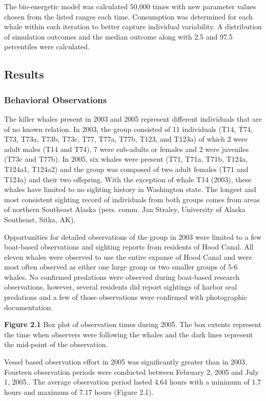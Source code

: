 The bio-energetic model was calculated 50,000 times with new parameter
values chosen from the listed ranges each time. Consumption was
determined for each whale within each iteration to better capture
individual variability. A distribution of simulation outcomes and the
median outcome along with 2.5 and 97.5 percentiles were calculated.

\subsection{Results}\label{results}

\subsubsection{Behavioral Observations}\label{behavioral-observations-1}

The killer whales present in 2003 and 2005 represent different
individuals that are of no known relation. In 2003, the group consisted
of 11 individuals (T14, T74, T73, T73a, T73b, T73c, T77, T77a, T77b,
T123, and T123a) of which 2 were adult males (T14 and T74), 7 were
sub-adults or females and 2 were juveniles (T73c and T77b). In 2005, six
whales were present (T71, T71a, T71b, T124a, T124a1, T124a2) and the
group was composed of two adult females (T71 and T124a) and their two
offspring. With the exception of whale T14 (2003), these whales have
limited to no sighting history in Washington state. The longest and most
consistent sighting record of individuals from both groups comes from
areas of northern Southeast Alaska (pers. comm. Jan Straley, University
of Alaska Southeast, Sitka, AK).

Opportunities for detailed observations of the group in 2003 were
limited to a few boat-based observations and sighting reports from
residents of Hood Canal. All eleven whales were observed to use the
entire expanse of Hood Canal and were most often observed as either one
large group or two smaller groups of 5-6 whales. No confirmed predations
were observed during boat-based research observations, however, several
residents did report sightings of harbor seal predations and a few of
those observations were confirmed with photographic documentation.

\textbf{Figure 2.1} Box plot of observation times during 2005. The box
extents represent the time when observers were following the whales and
the dark lines represent the mid-point of the observation.

Vessel based observation effort in 2005 was significantly greater than
in 2003. Fourteen observation periods were conducted between February 2,
2005 and July 1, 2005.. The average observation period lasted 4.64 hours
with a minimum of 1.7 hours and maximum of 7.17 hours (Figure 2.1).

